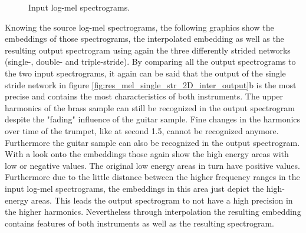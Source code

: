 \begin{figure}[htb!]
    \centering
    \captionsetup{justification=centering}
    \caption{Input log-mel spectrograms.}
    \label{fig:res_mel_original_guit_brass}
\end{figure}

Knowing the source log-mel spectrograms, the following graphics show the embeddings of those spectrograms, the interpolated embedding as well as the resulting output spectrogram using again the three differently strided networks (single-, double- and triple-stride). By comparing all the output spectrograms to the two input spectrograms, it again can be said that the output of the single stride network in figure \ref{fig:res_mel_single_str_2D_inter_output}b is the most precise and contains the most characteristics of both instruments. The upper harmonics of the brass sample can still be recognized in the output spectrogram despite the "fading" influence of the guitar sample. Fine changes in the harmonics over time of the trumpet, like at second 1.5, cannot be recognized anymore. Furthermore the guitar sample can also be recognized in the output spectrogram. With a look onto the embeddings those again show the high energy areas with low or negative values. The original low energy areas in turn have positive values. Furthermore due to the little distance between the higher frequency ranges in the input log-mel spectrograms, the embeddings in this area just depict the high-energy areas. This leads the output spectrogram to not have a high precision in the higher harmonics. Nevertheless through interpolation the resulting embedding contains features of both instruments as well as the resulting spectrogram. 

